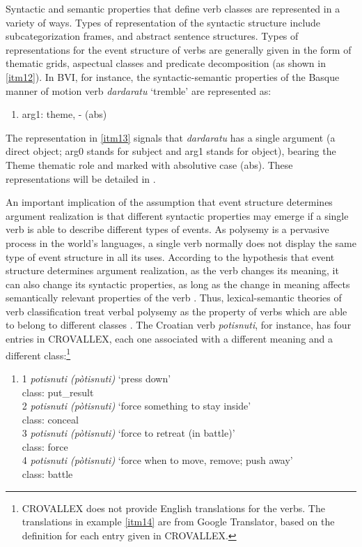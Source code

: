 \documentclass[english]{textolivre}
\begin{document}
Syntactic and semantic properties that define verb classes are represented in a variety of ways. Types of representation of the syntactic structure include subcategorization frames, and abstract sentence structures. Types of representations for the event structure of verbs are generally given in the form of thematic grids, aspectual classes and predicate decomposition (as shown in \ref{itm12}). In BVI, for instance, the syntactic-semantic properties of the Basque manner of motion verb \textit{dardaratu} ‘tremble’ are represented as:

\begin{enumerate}[label=(\arabic*), resume]
    \item \label{itm13} arg1: theme, - (abs) 
\end{enumerate}
   
The representation in \cref{itm13} signals that \textit{dardaratu} has a single argument (a direct object; arg0 stands for subject and arg1 stands for object), bearing the Theme thematic role and marked with absolutive case (abs). These representations will be detailed in .

An important implication of the assumption that event structure determines argument realization is that different syntactic properties may emerge if a single verb is able to describe different types of events. As polysemy is a pervasive process in the world’s languages, a single verb normally does not display the same type of event structure in all its uses. According to the hypothesis that event structure determines argument realization, as the verb changes its meaning, it can also change its syntactic properties, as long as the change in meaning affects semantically relevant properties of the verb \cite{amaral_polysemy_2016}. Thus, lexical-semantic theories of verb classification treat verbal polysemy as the property of verbs which are able to belong to different classes \cite{arsenijevic_lexicalized_2013,cancado_introducao_2016}. The Croatian verb \textit{potisnuti}, for instance, has four entries in CROVALLEX, each one associated with a different meaning and a different class:\footnote{CROVALLEX does not provide English translations for the verbs. The translations in example \ref{itm14} are from Google Translator, based on the definition for each entry given in CROVALLEX.}

\begin{enumerate}[label=(\arabic*),resume]
\item \label{itm14} 1 \textit{potisnuti (pòtisnuti)} ‘press down’ \\
class: put\_result \\
2 \textit{potisnuti (pòtisnuti)} ‘force something to stay inside’ \\
class: conceal \\
3 \textit{potisnuti (pòtisnuti)} ‘force to retreat (in battle)’ \\ 
class: force \\
4 \textit{potisnuti (pòtisnuti)} ‘force when to move, remove; push away’ \\
class: battle 
\end{enumerate}
\end{document}
